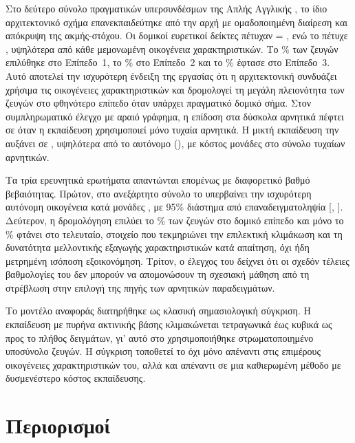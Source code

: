 Στο δεύτερο σύνολο πραγματικών υπερσυνδέσμων της Απλής Αγγλικής
, το ίδιο αρχιτεκτονικό σχήμα επανεκπαιδεύτηκε από την αρχή με
ομαδοποιημένη διαίρεση και απόκρυψη της ακμής-στόχου.
Οι δομικοί ευρετικοί
δείκτες πέτυχαν  = \WfStructuralFone{}, ενώ το 
πέτυχε \WfCascadeFone{}, υψηλότερα από κάθε μεμονωμένη οικογένεια
χαρακτηριστικών.
Το \WfTierOnePct\% των ζευγών επιλύθηκε στο Επίπεδο~1, το
\WfTierTwoPct\% στο Επίπεδο~2 και το \WfTierThreePct\% έφτασε στο Επίπεδο~3.
Αυτό αποτελεί την ισχυρότερη ένδειξη της εργασίας ότι η αρχιτεκτονική συνδυάζει
χρήσιμα τις οικογένειες χαρακτηριστικών και δρομολογεί τη μεγάλη πλειονότητα
των ζευγών στο φθηνότερο επίπεδο όταν υπάρχει πραγματικό δομικό σήμα.
Στον συμπληρωματικό έλεγχο με αραιό γράφημα, η επίδοση στα δύσκολα αρνητικά
πέφτει σε \WsRandomHardCascadeFone{} όταν η εκπαίδευση χρησιμοποιεί μόνο
τυχαία αρνητικά. Η μικτή εκπαίδευση την αυξάνει σε
\WsMixedHardCascadeFone{}, υψηλότερα από το αυτόνομο
 (\WsMixedHardEmbeddingFone{}), με κόστος
\WsRandomCost{} μονάδες  στο σύνολο τυχαίων αρνητικών.

Τα τρία ερευνητικά ερωτήματα απαντώνται επομένως με διαφορετικό βαθμό
βεβαιότητας.
Πρώτον, στο ανεξάρτητο σύνολο το  υπερβαίνει την
ισχυρότερη αυτόνομη οικογένεια κατά \WfCascadeDeltaStructural{} μονάδες
, με 95\% διάστημα από επαναδειγματοληψία 
[\WfCascadeDeltaStructuralCiLow{}, \WfCascadeDeltaStructuralCiHigh{}]. Δεύτερον,
η δρομολόγηση επιλύει το \WfTierOnePct\% των ζευγών στο δομικό επίπεδο και μόνο
το \WfTierThreePct\% φτάνει στο τελευταίο, στοιχείο που τεκμηριώνει την επιλεκτική
κλιμάκωση και τη δυνατότητα μελλοντικής εξαγωγής χαρακτηριστικών κατά απαίτηση,
όχι ήδη μετρημένη ισόποση εξοικονόμηση.
Τρίτον, ο έλεγχος του 
δείχνει ότι οι σχεδόν τέλειες βαθμολογίες του δεν μπορούν να απομονώσουν τη
σχεσιακή μάθηση από τη στρέβλωση στην επιλογή της πηγής των αρνητικών παραδειγμάτων.

Το μοντέλο αναφοράς  διατηρήθηκε ως κλασική σημασιολογική
σύγκριση.
Η εκπαίδευση  με πυρήνα ακτινικής βάσης κλιμακώνεται
τετραγωνικά έως κυβικά ως προς το πλήθος δειγμάτων, γι' αυτό στο 
χρησιμοποιήθηκε στρωματοποιημένο υποσύνολο \SvmSampleSize{} ζευγών.
Η σύγκριση
τοποθετεί το  όχι μόνο απέναντι στις επιμέρους οικογένειες
χαρακτηριστικών του, αλλά και απέναντι σε μια καθιερωμένη μέθοδο με δυσμενέστερο
κόστος εκπαίδευσης.

\section{Περιορισμοί}
\label{sec:limitations-cost}

